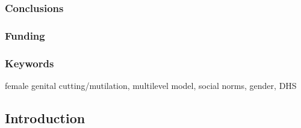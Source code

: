 \documentclass[12pt,]{article}
\begin{document}
\subsubsection{Conclusions}\label{conclusions}

\subsubsection{Funding}\label{funding}

\subsubsection{Keywords}\label{keywords}

female genital cutting/mutilation, multilevel model, social norms, gender, DHS

\subsection{Introduction}\label{introduction}
\end{document}
